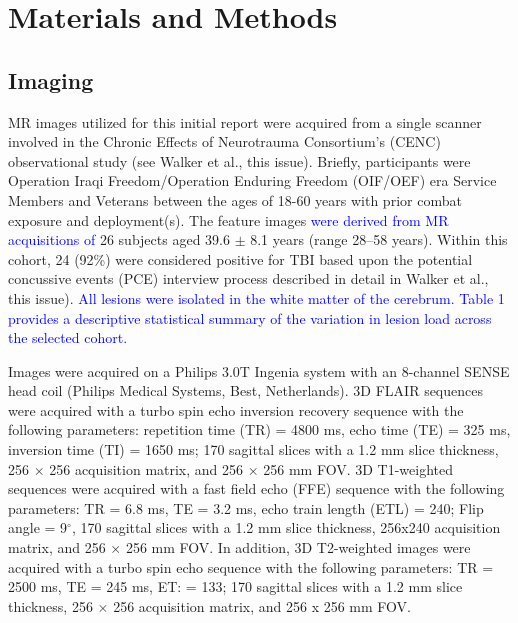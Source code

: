 \documentclass[11pt,]{article}
\begin{document}
\section{Materials and Methods}\label{materials-and-methods}

\subsection{Imaging}\label{imaging}

MR images utilized for this initial report were acquired from a single
scanner involved in the Chronic Effects of Neurotrauma Consortium's
(CENC) observational study (see Walker et al., this issue). Briefly,
participants were Operation Iraqi Freedom/Operation Enduring Freedom
(OIF/OEF) era Service Members and Veterans between the ages of 18-60
years with prior combat exposure and deployment(s). The feature images
\textcolor{blue}{were derived from MR acquisitions of} 26 subjects aged
39.6 \(\pm\) 8.1 years (range 28--58 years). Within this cohort, 24
(92\%) were considered positive for TBI based upon the potential
concussive events (PCE) interview process described in detail in Walker
et al., this issue).
\textcolor{blue}{All lesions were isolated in the white matter of the cerebrum.  Table 1 provides a descriptive statistical summary of the variation in lesion
load across the selected cohort.}



Images were acquired on a Philips 3.0T Ingenia system with an 8-channel
SENSE head coil (Philips Medical Systems, Best, Netherlands). 3D FLAIR
sequences were acquired with a turbo spin echo inversion recovery
sequence with the following parameters: repetition time (TR) = 4800 ms,
echo time (TE) = 325 ms, inversion time (TI) = 1650 ms; 170 sagittal
slices with a 1.2 mm slice thickness, 256 \(\times\) 256 acquisition
matrix, and 256 \(\times\) 256 mm FOV. 3D T1-weighted sequences were
acquired with a fast field echo (FFE) sequence with the following
parameters: TR = 6.8 ms, TE = 3.2 ms, echo train length (ETL) = 240;
Flip angle = 9\(^\circ\), 170 sagittal slices with a 1.2 mm slice
thickness, 256x240 acquisition matrix, and 256 \(\times\) 256 mm FOV. In
addition, 3D T2-weighted images were acquired with a turbo spin echo
sequence with the following parameters: TR = 2500 ms, TE = 245 ms, ET: =
133; 170 sagittal slices with a 1.2 mm slice thickness, 256 \(\times\)
256 acquisition matrix, and 256 x 256 mm FOV.
\end{document}

